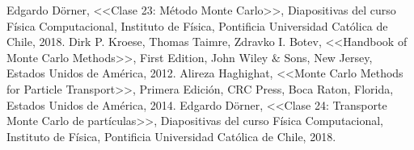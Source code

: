 
\pagebreak
\begin{thebibliography}{0}
 Edgardo Dörner, <<Clase 23: Método Monte Carlo>>, Diapositivas del curso Física Computacional, Instituto de Física, Pontificia Universidad Católica de Chile, 2018.
 Dirk P. Kroese, Thomas Taimre, Zdravko I. Botev, <<Handbook of Monte Carlo Methods>>, First Edition, John Wiley $\&$ Sons, New Jersey, Estados Unidos de América, 2012.
 Alireza Haghighat, <<Monte Carlo Methods for Particle Transport>>, Primera Edición, CRC Press, Boca Raton, Florida, Estados Unidos de América, 2014.
 Edgardo Dörner, <<Clase 24: Transporte Monte Carlo de partículas>>, Diapositivas del curso Física Computacional, Instituto de Física, Pontificia Universidad Católica de Chile, 2018.

\end{thebibliography}
